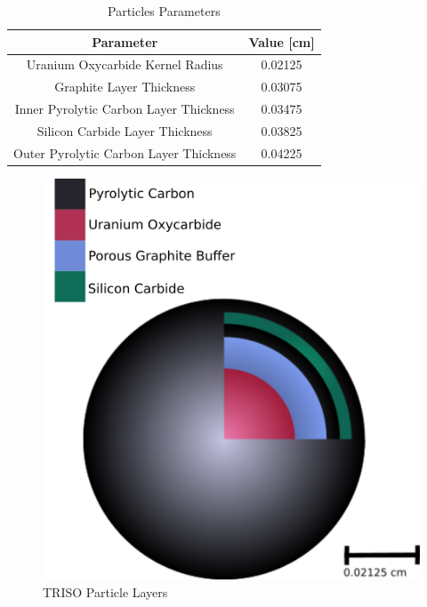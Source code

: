 
\begin{table}[h!]
\centering

\caption{Particles Parameters}
\begin{tabular}{ c  c }
\hline
Parameter & Value [cm] \\
\hline 
Uranium Oxycarbide Kernel Radius & 0.02125 \\
Graphite Layer Thickness & 0.03075 \\
Inner Pyrolytic Carbon Layer Thickness & 0.03475 \\
Silicon Carbide Layer Thickness & 0.03825 \\
Outer Pyrolytic Carbon Layer Thickness & 0.04225 \\
\hline
\end{tabular}
\label{table:particle-params}

\end{table}

\begin{figure}[H]
\centering

\includegraphics[width=0.5\linewidth]{figures/trisos-r-like-onions.png}
\caption{TRISO Particle Layers}
\label{fig:particle-layer}
\end{figure}
